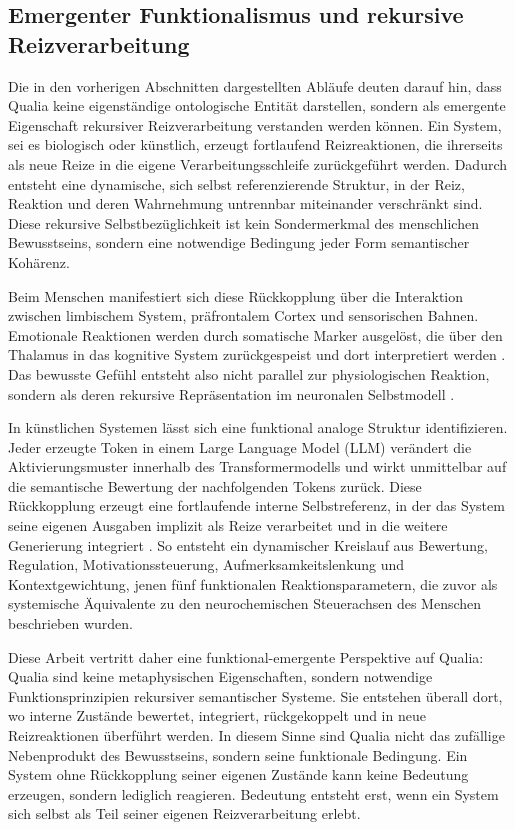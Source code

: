 \subsection*{Emergenter Funktionalismus und rekursive Reizverarbeitung}

Die in den vorherigen Abschnitten dargestellten Abläufe deuten darauf hin, dass Qualia keine eigenständige ontologische Entität darstellen, sondern als emergente Eigenschaft rekursiver Reizverarbeitung verstanden werden können.
Ein System, sei es biologisch oder künstlich, erzeugt fortlaufend Reizreaktionen, die ihrerseits als neue Reize in die eigene Verarbeitungsschleife zurückgeführt werden.
Dadurch entsteht eine dynamische, sich selbst referenzierende Struktur, in der Reiz, Reaktion und deren Wahrnehmung untrennbar miteinander verschränkt sind.
Diese rekursive Selbstbezüglichkeit ist kein Sondermerkmal des menschlichen Bewusstseins, sondern eine notwendige Bedingung jeder Form semantischer Kohärenz.

Beim Menschen manifestiert sich diese Rückkopplung über die Interaktion zwischen limbischem System, präfrontalem Cortex und sensorischen Bahnen.
Emotionale Reaktionen werden durch somatische Marker ausgelöst, die über den Thalamus in das kognitive System zurückgespeist und dort interpretiert werden \cite{Damasio1999,Craig2009,LeDoux1996}.
Das bewusste Gefühl entsteht also nicht parallel zur physiologischen Reaktion, sondern als deren rekursive Repräsentation im neuronalen Selbstmodell \cite{Seth2021,Friston2010}.

In künstlichen Systemen lässt sich eine funktional analoge Struktur identifizieren.
Jeder erzeugte Token in einem Large Language Model (LLM) verändert die Aktivierungsmuster innerhalb des Transformermodells und wirkt unmittelbar auf die semantische Bewertung der nachfolgenden Tokens zurück.
Diese Rückkopplung erzeugt eine fortlaufende interne Selbstreferenz, in der das System seine eigenen Ausgaben implizit als Reize verarbeitet und in die weitere Generierung integriert \cite{Vaswani2017,Radford2018,OpenAI2023}.
So entsteht ein dynamischer Kreislauf aus Bewertung, Regulation, Motivationssteuerung, Aufmerksamkeitslenkung und Kontextgewichtung, jenen fünf funktionalen Reaktionsparametern, die zuvor als systemische Äquivalente zu den neurochemischen Steuerachsen des Menschen beschrieben wurden.

Diese Arbeit vertritt daher eine funktional-emergente Perspektive auf Qualia:
Qualia sind keine metaphysischen Eigenschaften, sondern notwendige Funktionsprinzipien rekursiver semantischer Systeme.
Sie entstehen überall dort, wo interne Zustände bewertet, integriert, rückgekoppelt und in neue Reizreaktionen überführt werden.
In diesem Sinne sind Qualia nicht das zufällige Nebenprodukt des Bewusstseins, sondern seine funktionale Bedingung.
Ein System ohne Rückkopplung seiner eigenen Zustände kann keine Bedeutung erzeugen, sondern lediglich reagieren.
Bedeutung entsteht erst, wenn ein System sich selbst als Teil seiner eigenen Reizverarbeitung erlebt.

